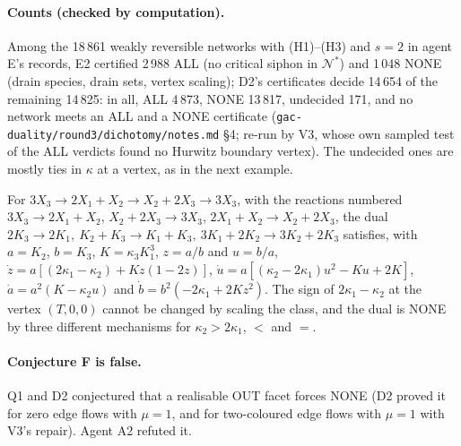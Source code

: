 \documentclass[11pt,a4paper]{report}
\newcommand{\Nd}{\mathcal{N}^{*}}
\begin{document}
\paragraph{Counts (checked by computation).} Among the 18\,861 weakly reversible networks with (H1)--(H3) and
\(s=2\) in
agent E's records, E2 certified 2\,988 ALL (no critical siphon in \(\Nd\)) and 1\,048 NONE (drain species, drain sets,
vertex scaling); D2's certificates decide 14\,654 of the remaining 14\,825: in all, ALL 4\,873, NONE 13\,817, undecided
171, and no network meets an ALL and a NONE certificate (\texttt{gac-duality/round3/dichotomy/notes.md} §4; re-run by
V3, whose own sampled test of the ALL verdicts found no Hurwitz boundary vertex). The undecided ones are mostly
ties in \(\kappa\) at a vertex, as in the next example.

\begin{example}\label{ex:U}
For \(3X_3\to2X_1+X_2\to X_2+2X_3\to3X_3\), with the reactions numbered \(3X_3\to2X_1+X_2\), \(X_2+2X_3\to3X_3\),
\(2X_1+X_2\to X_2+2X_3\), the dual \(2K_3\to2K_1,\ K_2+K_3\to K_1+K_3,\ 3K_1+2K_2\to3K_2+2K_3\) satisfies,
with \(a=K_2\), \(b=K_3\), \(K=\kappa_3K_1^3\), \(z=a/b\) and \(u=b/a\),
\(\dot z=a[(2\kappa_1-\kappa_2)+Kz(1-2z)]\), \(\dot u=a[(\kappa_2-2\kappa_1)u^2-Ku+2K]\), \(\dot a=a^2(K-\kappa_2u)\) and
\(\dot b=b^2(-2\kappa_1+2Kz^2)\). The sign of \(2\kappa_1-\kappa_2\) at the vertex \((T,0,0)\) cannot be changed by scaling the
class, and the dual is NONE by three different mechanisms for \(\kappa_2>2\kappa_1\), \(<\) and \(=\).
\end{example}

\paragraph{Conjecture F is false.} Q1 and D2 conjectured that a realisable OUT facet forces NONE (D2 proved it for zero
edge flows with \(\mu=1\), and for two-coloured edge flows with \(\mu=1\) with V3's repair). Agent A2 refuted it.
\end{document}
